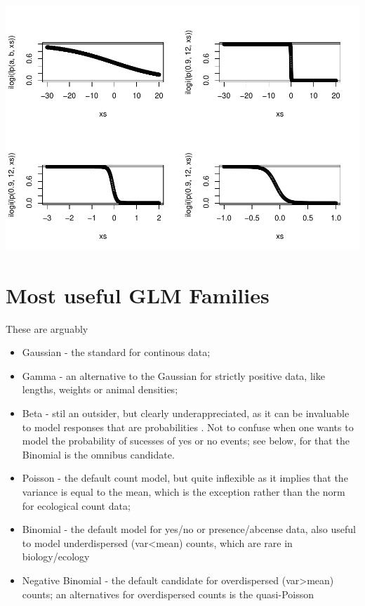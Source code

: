 \documentclass[
]{book}
\providecommand{\tightlist}{%
  \setlength{\itemsep}{0pt}\setlength{\parskip}{0pt}}
\begin{document}
\includegraphics{ECOMODbook_files/figure-latex/links2-1.pdf}

\hypertarget{most-useful-glm-families}{%
\section{Most useful GLM Families}\label{most-useful-glm-families}}

These are arguably

\begin{itemize}
\tightlist
\item
  Gaussian - the standard for continous data;
\item
  Gamma - an alternative to the Gaussian for strictly positive data, like lengths, weights or animal densities;
\item
  Beta - stil an outsider, but clearly underappreciated, as it can be invaluable to model responses that are probabilities \citep{Douma2019}. Not to confuse when one wants to model the probability of sucesses of yes or no events; see below, for that the Binomial is the omnibus candidate.
\item
  Poisson - the default count model, but quite inflexible as it implies that the variance is equal to the mean, which is the exception rather than the norm for ecological count data;
\item
  Binomial - the default model for yes/no or presence/abcense data, also useful to model underdispersed (var\textless mean) counts, which are rare in biology/ecology
\item
  Negative Binomial - the default candidate for overdispersed (var\textgreater mean) counts; an alternatives for overdispersed counts is the quasi-Poisson \citep{Hoef2007}
\end{itemize}
\end{document}
